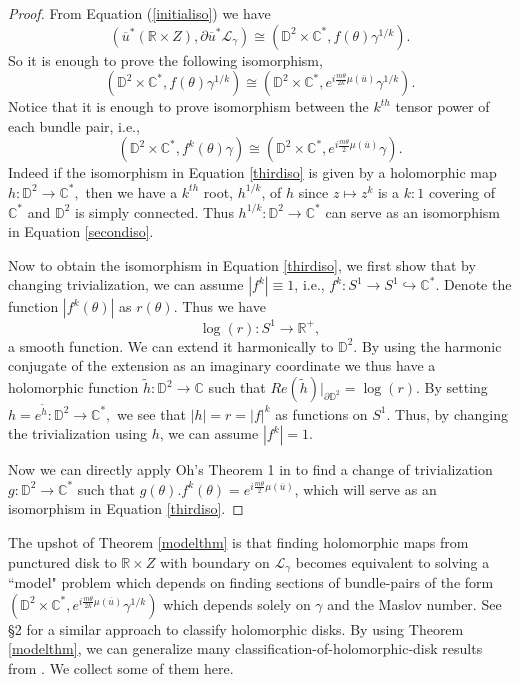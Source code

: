 \documentclass[11pt, oneside,dvipsnames]{amsart}
\renewcommand{\to}{\rightarrow}
\newcommand{\wt}{\widetilde}
\renewcommand{\to}{\rightarrow}
\newcommand{\<}{\langle}
\renewcommand{\>}{\rangle}
\newcommand{\bC}{\mathbb{C}}
\newcommand{\bD}{\mathbb{D}}
\newcommand{\bR}{\mathbb{R}}
\newcommand{\cL}{\mathcal{L}}
\renewcommand{\to}{\rightarrow}
\theoremstyle{definition}
\theoremstyle{definition}
\numberwithin{equation}{subsection}
\begin{document}
\begin{proof}
    From Equation (\ref{initialiso}) we have 
    \begin{equation*}
(\overline{u}^* (\bR \times Z), \partial{\overline{u}}^* \cL_\gamma) \cong (\bD^2 \times \bC^*, f(\theta) \gamma^{1/k} ).
\end{equation*} So it is enough to prove the following isomorphism,
\begin{equation}\label{secondiso}
(\bD^2 \times \bC^*, f(\theta) \gamma^{1/k} ) \cong (\bD^2 \times \bC^*, e^{i\frac{m\theta}{2k}\mu(\overline{u})}\gamma^{1/k} ).
\end{equation}
Notice that it is enough to prove isomorphism between the $k^{th}$ tensor power of each bundle pair, i.e.,
\begin{equation}\label{thirdiso}
(\bD^2 \times \bC^*, f^k(\theta) \gamma ) \cong (\bD^2 \times \bC^*, e^{i\frac{m\theta}{2}\mu(\overline{u})}\gamma ).
\end{equation}
Indeed if the isomorphism in Equation \ref{thirdiso} is given by a holomorphic map $h : \bD^2 \to \bC^*,$ then we have a $k^{th}$ root, $h^{1/k}$, of $h$ since $z \mapsto z^k$ is a $k:1$ covering of $\bC^*$ and $\bD^2$ is simply connected. Thus $h^{1/k} : \bD^2 \to \bC^*$ can serve as an isomorphism in Equation \ref{secondiso}.

Now to obtain the isomorphism in Equation \ref{thirdiso}, we first show that by changing trivialization, we can assume $|f^k| \equiv 1$, i.e., $f^k : S^1 \to S^1 \hookrightarrow \bC^*.$ Denote the function $|f^k (\theta)|$ as $ r(\theta). $ Thus we have $$
\log (r) : S^1 \to \bR^+,$$ a smooth function. We can extend it harmonically to $\bD^2.$ By using the harmonic conjugate of the extension as an imaginary coordinate we thus have a holomorphic function $\wt h : \bD^2 \to \bC$ such that $Re(\wt h)|_{\partial \bD^2} = \log (r).$ By setting $h= e^{\wt h} : \bD^2 \to \bC^*,$ we see that $|h| = r = |f|^k$ as functions on $S^1$. Thus, by changing the trivialization using $h$, we can assume $|f^k| = 1.$

Now we can directly apply Oh's Theorem 1 in \cite{riemHilb} to find a change of trivialization $g:\bD^2 \to \bC^*$ such that $g(\theta).f^k(\theta)= e^{i\frac{m\theta}{2}\mu(\overline{u})}$, which will serve as an isomorphism in Equation \ref{thirdiso}.
\end{proof}




The upshot of Theorem \ref{modelthm} is that finding holomorphic maps from punctured disk to $\bR \times Z$ with boundary on $\cL_\gamma$ becomes equivalent to solving a ``model" problem which depends on finding sections of bundle-pairs of the form $(\bD^2 \times \bC^*, e^{i\frac{m\theta}{2k}\mu(\overline{u})} \gamma^{1/k} )$ which depends solely on $\gamma$ and the Maslov number. See \S 2 \cite{bcsw2} for a similar approach to classify holomorphic disks. By using Theorem \ref{modelthm}, we can generalize many classification-of-holomorphic-disk results from \cite{Cha23}. We collect some of them here.
\end{document}
